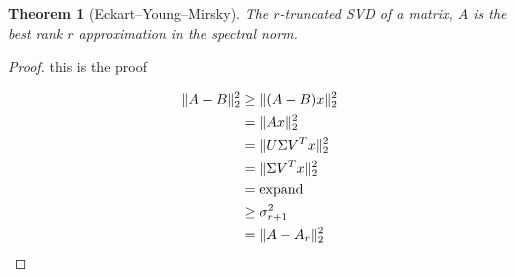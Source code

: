 \documentclass[11pt,a4paper]{article}
\title{}
\author{Brady Metherall}
\date{}
\let\originalleft\left
\let\originalright\right
\renewcommand{\left}{\mathopen{}\mathclose\bgroup\originalleft}
\renewcommand{\right}{\aftergroup\egroup\originalright}
\newtheorem{theorem}{Theorem}
\begin{document}
\maketitle

\begin{theorem}[Eckart--Young--Mirsky]
The $r$-truncated SVD of a matrix, $A$ is the best rank $r$ approximation in the spectral norm.
\end{theorem}

\begin{proof}
this is the proof

\begin{align*}
\| A - B \|_2^2 &\geq \| \left( A - B \right) x \|_2^2 \\
&= \| Ax \|_2^2 \\
&= \| U \Sigma V^T x \|_2^2 \\
&= \| \Sigma V^T x \|_2^2 \\
&= \text{expand} \\
&\geq \sigma_{r+1}^2 \\
&= \| A - A_r \|_2^2
\end{align*}
\end{proof}

%
\end{document}
